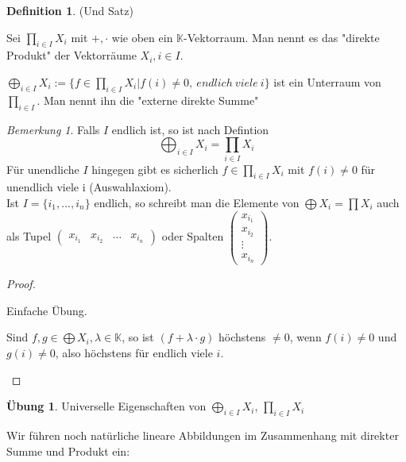 \documentclass[12pt,a4paper]{article}
\theoremstyle{definition}
\newtheorem{definition}[theorem]{Definition}
\newtheorem*{exercise}{Übung}
\theoremstyle{remark}
\newtheorem*{remark}{Bemerkung}
\begin{document}
	\begin{definition}{(Und Satz)}
		\begin{proofenum}
			\item 
				Sei $\prod_{i \in I} X_i$ mit $+, \cdot$ wie oben ein $\mathbb{K}$-Vektorraum. Man nennt es das "direkte Produkt" der Vektorräume $X_i, i \in I$.
			\item
				$\bigoplus_{i \in I} X_i :=\{ f \in \prod_{i \in I} X_i | f(i) \neq 0 , \ endlich \ viele \ i \}$ ist ein Unterraum von $\prod\limits_{i \in I}$. Man nennt ihn die "externe direkte Summe"
		\end{proofenum}
		\begin{remark}
			Falls $I$ endlich ist, so ist nach Defintion
			\begin{equation}
				\bigoplus_{i \in I} X_i = \prod_{i \in I} X_i
			\end{equation}
			Für unendliche $I$ hingegen gibt es sicherlich $f \in \prod_{i \in I} X_i$ mit $f(i) \neq 0$ für unendlich viele i (Auswahlaxiom). \\
			Ist $I = \{ i_1,...,i_n \}$ endlich, so schreibt man die Elemente von $\bigoplus X_i = \prod X_i$ auch als Tupel $\begin{pmatrix}
			x_{i_1}& x_{i_2} & \dots & x_{i_n}
			\end{pmatrix}$ oder Spalten $\begin{pmatrix}
			x_{i_1} \\
			x_{i_2} \\
			\vdots \\
			x_{i_n}
			\end{pmatrix}$.
		\end{remark}
	\end{definition}
	\begin{proof}
		\begin{proofenum}
			\item Einfache Übung. \\		
			\item Sind $f,g \in \bigoplus X_i, \lambda \in \mathbb{K}$, so ist $(f+\lambda \cdot g)$ höchstens $\neq 0$, wenn $f(i) \neq 0$ und $g(i) \neq 0$, also höchstens für endlich viele $i$.
		\end{proofenum}
	\end{proof}
	\begin{exercise}
		Universelle Eigenschaften von $\bigoplus_{i \in I} X_i$, $\prod_{i \in I} X_i$
	\end{exercise}
	Wir führen noch natürliche lineare Abbildungen im Zusammenhang mit direkter Summe und Produkt ein: \\
\end{document}
